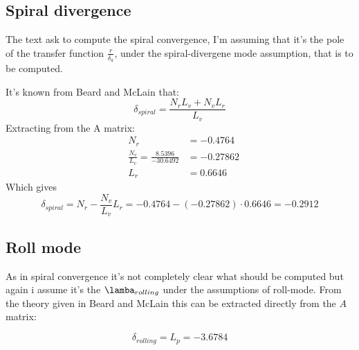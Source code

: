 \documentclass[11pt]{article}
\begin{document}
\subsection{Spiral divergence}
The text ask to compute the spiral convergence, I'm assuming that it's the pole of the transfer function $\frac{r}{\delta_a}$, under the spiral-divergene mode assumption, that is to be computed.

It's known from Beard and McLain that: 
\[\delta_{spiral} = \frac{N_r L_v + N_v L_r}{L_v} \]
Extracting from the A matrix:
\begin{align}
&N_r &= -0.4764 \\
&\frac{N_v}{L_v} = \frac{8.5396}{-30.6492} &= -0.27862 \\
&L_r &= 0.6646
\end{align} 
Which gives
\[\delta_{spiral} = N_r - \frac{N_v}{L_v} L_r = -0.4764 - (- 0.27862) \cdot 0.6646 = -0.2912 \]



\subsection{Roll mode}
As in spiral convergence it's not completely clear what should be computed but again i assume it's the $\lamba_{rolling}$ under the assumptions of roll-mode. From the theory given in Beard and McLain this can be extracted directly from the $A$ matrix:

\[\delta_{rolling} = L_p = -3.6784\]
\end{document}
